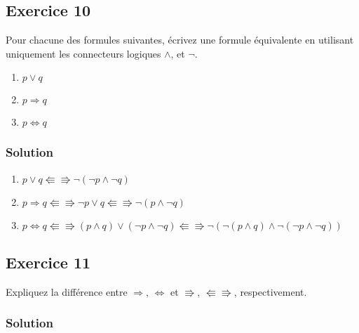 \subsection*{Exercice 10}
Pour chacune des formules suivantes, écrivez une formule équivalente
en utilisant uniquement les connecteurs logiques $\land$, et $\neg$.
\begin{enumerate}
	\item $p \lor q$
	\item $p \Rightarrow q$
	\item $p \Leftrightarrow q$
\end{enumerate}


\subsubsection*{Solution}

    \begin{enumerate}
        \item $p \lor q \Lleftarrow \Rrightarrow \neg (\neg p \land \neg q)$
        \item $p \Rightarrow q \Lleftarrow \Rrightarrow \neg p \lor q \Lleftarrow \Rrightarrow \neg (p \land \neg q)$
        \item $p \Leftrightarrow q \Lleftarrow \Rrightarrow (p \land q) \lor (\neg p \land \neg q) \Lleftarrow \Rrightarrow \neg(\neg(p \land q) \land \neg(\neg p \land \neg q))$
    \end{enumerate}

\subsection*{Exercice 11}
Expliquez la différence entre $\Rightarrow$, $\Leftrightarrow$ et $\Rrightarrow$, $\Lleftarrow\!\!\!\!\Rrightarrow$, respectivement.


\subsubsection*{Solution}

